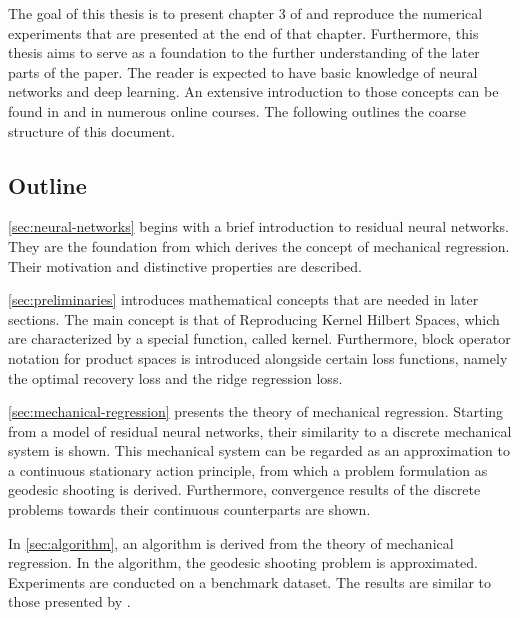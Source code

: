 The goal of this thesis is to present chapter 3 of \cite{owhadi20} and reproduce the numerical experiments that are presented at the end of that chapter.
Furthermore, this thesis aims to serve as a foundation to the further understanding of the later parts of the paper.
The reader is expected to have basic knowledge of neural networks and deep learning.
An extensive introduction to those concepts can be found in \cite{goodfellow16} and in numerous online courses.
The following outlines the coarse structure of this document.

\subsection{Outline}

\cref{sec:neural-networks} begins with a brief introduction to residual neural networks.
They are the foundation from which \citet{owhadi20} derives the concept of mechanical regression.
Their motivation and distinctive properties are described.

\cref{sec:preliminaries} introduces mathematical concepts that are needed in later sections.
The main concept is that of Reproducing Kernel Hilbert Spaces, which are characterized by a special function, called kernel.
Furthermore, block operator notation for product spaces is introduced alongside certain loss functions, namely the optimal recovery loss and the ridge regression loss.

\cref{sec:mechanical-regression} presents the theory of mechanical regression.
Starting from a model of residual neural networks, their similarity to a discrete mechanical system is shown.
This mechanical system can be regarded as an approximation to a continuous stationary action principle, from which a problem formulation as geodesic shooting is derived.
Furthermore, convergence results of the discrete problems towards their continuous counterparts are shown.

In \cref{sec:algorithm}, an algorithm is derived from the theory of mechanical regression.
In the algorithm, the geodesic shooting problem is approximated.
Experiments are conducted on a benchmark dataset.
The results are similar to those presented by \citet{owhadi20}.